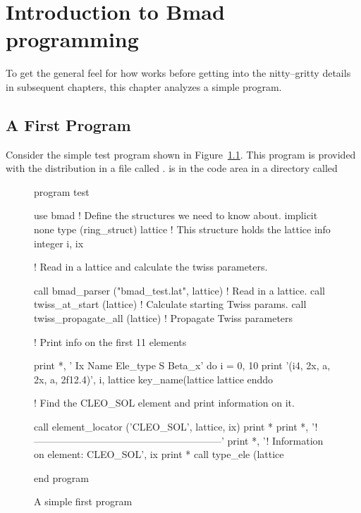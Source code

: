 \chapter{Introduction to Bmad programming}
\label{c:program_info}

To get the general feel for how \bmad works before
getting into the nitty--gritty details in subsequent chapters, this
chapter analyzes a simple program.

\section{A First Program}

Consider the simple test program shown in Figure~\ref{f:program}.
This program is provided with the \bmad distribution in a file called
.  is in the  code area in a
directory called 

\begin{figure}
\begin{listing}{1}
program test

  use bmad                 ! Define the structures we need to know about.
  implicit none
  type (ring_struct) lattice  ! This structure holds the lattice info
  integer i, ix

! Read in a lattice and calculate the twiss parameters.

  call bmad_parser ("bmad_test.lat", lattice)    ! Read in a lattice.
  call twiss_at_start (lattice)           ! Calculate starting Twiss params.
  call twiss_propagate_all (lattice)      ! Propagate Twiss parameters

! Print info on the first 11 elements

  print *, ' Ix  Name              Ele_type                   S      Beta_x'
  do i = 0, 10
    print '(i4, 2x, a, 2x, a, 2f12.4)', i, lattice%
                    key_name(lattice%
                    lattice%
  enddo

! Find the CLEO_SOL element and print information on it.

  call element_locator ('CLEO_SOL', lattice, ix)
  print *
  print *, '!---------------------------------------------------------'
  print *, '! Information on element: CLEO_SOL', ix
  print *
  call type_ele (lattice%

end program
\end{listing}
\caption{A simple first program}
\label{f:program}
\end{figure}

